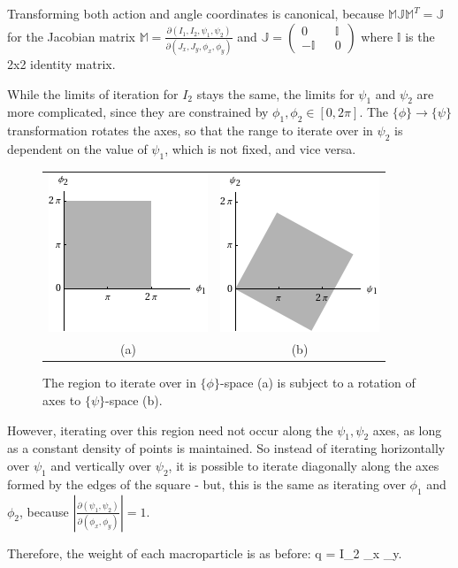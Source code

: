 Transforming both action and angle coordinates is canonical, because $\mathbb{M}\mathbb{J}\mathbb{M}^T = \mathbb{J}$ for the Jacobian matrix $\mathbb{M} = \frac{\partial(I_1,I_2,\psi_1,\psi_2)}{\partial(J_x,J_y,\phi_x,\phi_y)}$ and $\mathbb{J} = (\begin{smallmatrix} 0 && \mathbb{I} \\ -\mathbb{I} && 0 \end{smallmatrix})$ where $\mathbb{I}$ is the 2x2 identity matrix.

While the limits of iteration for $I_2$ stays the same, the limits for $\psi_1$ and $\psi_2$ are more complicated, since they are constrained by $\phi_1,\phi_2 \in [0,2\pi]$.  The $\lbrace\phi\rbrace \rightarrow \lbrace\psi\rbrace$ transformation rotates the axes, so that the range to iterate over in $\psi_2$ is dependent on the value of $\psi_1$, which is not fixed, and vice versa.  
\begin{figure}[htp]
	\centering
	\begin{tabular}{c c}
	\includegraphics[scale=0.6]{phiblock.png} & \includegraphics[scale=0.6]{psiblock.png} \\
	(a) & (b)
	\end{tabular}
	\caption{The region to iterate over in $\lbrace\phi\rbrace$-space (a) is subject to a rotation of axes to $\lbrace\psi\rbrace$-space (b).}
	\label{fig:phipsi}
\end{figure}

However, iterating over this region need not occur along the $\psi_1,\psi_2$ axes, as long as a constant density of points is maintained.  So instead of iterating horizontally over $\psi_1$ and vertically over $\psi_2$, it is possible to iterate diagonally along the axes formed by the edges of the square - but, this is the same as iterating over $\phi_1$ and $\phi_2$, because $\left\vert\frac{\partial(\psi_1,\psi_2)}{\partial(\phi_x,\phi_y)}\right\vert = 1$.

Therefore, the weight of each macroparticle is as before:
\Begineq
	q =  \Delta I_2 \Delta \phi_x \Delta \phi_y.
\Endeq


